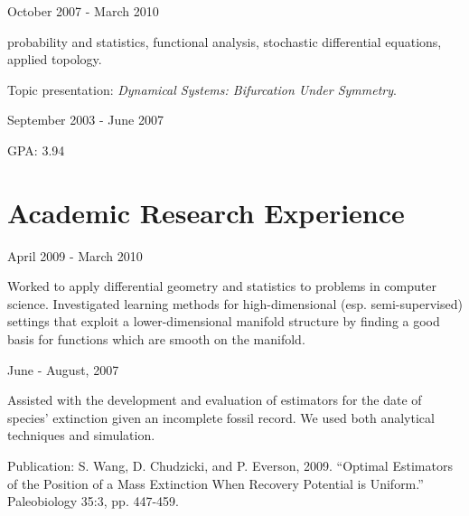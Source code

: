 \documentclass[letterpaper]{resume}
\begin{document}
{October 2007 - March 2010}
{}
{}
\begin{compactitem}
\item probability and statistics, functional analysis, stochastic differential equations, applied topology.
\item Topic presentation: \textit{Dynamical Systems: Bifurcation Under Symmetry}.      
\end{compactitem}


{September 2003 - June 2007}
{}
{}
\begin{compactitem}
\item GPA: 3.94 
\end{compactitem}


\section{Academic Research Experience}

{April 2009 - March 2010}
{}
{}
\begin{compactitem}
\item Worked to apply differential geometry and 
statistics to problems in computer science. Investigated learning methods for 
high-dimensional (esp. semi-supervised) settings that exploit a lower-dimensional manifold structure by finding a good 
basis for functions which are smooth on the manifold.
\end{compactitem}

{June - August, 2007}
{}
{}
\begin{compactitem}
\item Assisted with the development and evaluation of estimators for the
date of species' extinction given an incomplete fossil record. We used
both analytical techniques and simulation.

\begin{compactitem}

\item Publication: S. Wang, D. Chudzicki, and P. Everson, 2009. ``Optimal Estimators of the Position of a Mass Extinction When Recovery Potential is Uniform.'' Paleobiology 35:3, pp. 447-459. 

\end{compactitem}

\end{compactitem}
\end{document}
